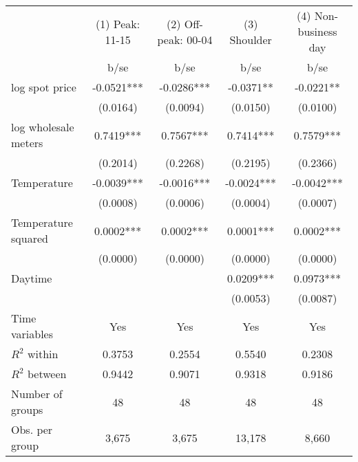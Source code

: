 \begin{tabular}{lcccc}\toprule
                    &(1) Peak: 11-15   &(2) Off-peak: 00-04   &(3) Shoulder   &(4) Non-business day   \\
                    &        b/se   &        b/se   &        b/se   &        b/se   \\
\midrule
log spot price      &     -0.0521***&     -0.0286***&     -0.0371** &     -0.0221** \\
                    &    (0.0164)   &    (0.0094)   &    (0.0150)   &    (0.0100)   \\
log wholesale meters&      0.7419***&      0.7567***&      0.7414***&      0.7579***\\
                    &    (0.2014)   &    (0.2268)   &    (0.2195)   &    (0.2366)   \\
Temperature         &     -0.0039***&     -0.0016***&     -0.0024***&     -0.0042***\\
                    &    (0.0008)   &    (0.0006)   &    (0.0004)   &    (0.0007)   \\
Temperature squared &      0.0002***&      0.0002***&      0.0001***&      0.0002***\\
                    &    (0.0000)   &    (0.0000)   &    (0.0000)   &    (0.0000)   \\
Daytime             &               &               &      0.0209***&      0.0973***\\
                    &               &               &    (0.0053)   &    (0.0087)   \\
Time variables      &         Yes   &         Yes   &         Yes   &         Yes   \\
\midrule
\(R^2\) within      &      0.3753   &      0.2554   &      0.5540   &      0.2308   \\
\(R^2\) between     &      0.9442   &      0.9071   &      0.9318   &      0.9186   \\
Number of groups    &          48   &          48   &          48   &          48   \\
Obs. per group      &       3,675   &       3,675   &      13,178   &       8,660   \\
\bottomrule\end{tabular}
